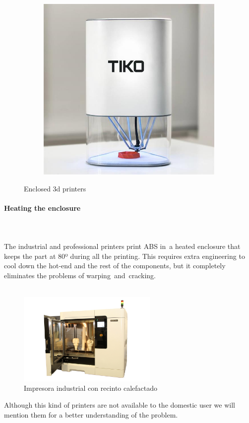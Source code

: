 \documentclass[11pt,a4paper]{article}
\begin{document}
\begin{figure}[H]
\begin{subfigure}[b]{0.3\textwidth}
        \includegraphics[width=\textwidth,cfbox=azul_marcos 4pt 0pt]{FOTOS/IMPRESORACERRADA3}
    \end{subfigure}
    \caption*{Enclosed 3d printers}
\end{figure}
			\paragraph{Heating the enclosure}\mbox{}\\\\
The industrial and professional printers print ABS in a heated enclosure that keeps the part at 80º during all the printing. This requires extra engineering to cool down the hot-end and the rest of the components, but it completely eliminates the problems of warping and cracking.
\\\\
\begin{figure}[H]
\centering
\includegraphics[width=0.6\textwidth,cfbox=azul_marcos 4pt 0pt]{FOTOS/STRATASYS}
\caption*{Impresora industrial con recinto calefactado}
\end{figure}
Although this kind of printers are not available to the domestic user we will mention them for a better understanding of the problem.
\end{document}
